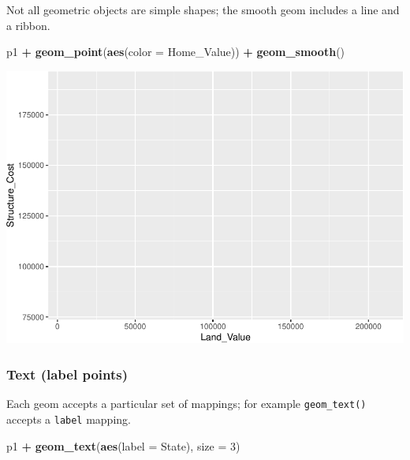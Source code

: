 \documentclass[]{book}
\newenvironment{Shaded}{\begin{snugshade}}{\end{snugshade}}
\newcommand{\DataTypeTok}[1]{\textcolor[rgb]{0.13,0.29,0.53}{#1}}
\newcommand{\DecValTok}[1]{\textcolor[rgb]{0.00,0.00,0.81}{#1}}
\newcommand{\KeywordTok}[1]{\textcolor[rgb]{0.13,0.29,0.53}{\textbf{#1}}}
\newcommand{\NormalTok}[1]{#1}
\newcommand{\OperatorTok}[1]{\textcolor[rgb]{0.81,0.36,0.00}{\textbf{#1}}}
\newcommand{\StringTok}[1]{\textcolor[rgb]{0.31,0.60,0.02}{#1}}
\begin{document}
Not all geometric objects are simple shapes; the smooth geom includes a line and a ribbon.

\begin{Shaded}
\begin{Highlighting}[]
\NormalTok{p1 }\OperatorTok{+}
\StringTok{  }\KeywordTok{geom_point}\NormalTok{(}\KeywordTok{aes}\NormalTok{(}\DataTypeTok{color =}\NormalTok{ Home_Value)) }\OperatorTok{+}
\StringTok{  }\KeywordTok{geom_smooth}\NormalTok{()}
\end{Highlighting}
\end{Shaded}

\includegraphics{R/Rgraphics/figures/unnamed-chunk-146-1.pdf}

\hypertarget{text-label-points}{%
\subsubsection{Text (label points)}\label{text-label-points}}

Each geom accepts a particular set of mappings; for example \texttt{geom\_text()} accepts a \texttt{label} mapping.

\begin{Shaded}
\begin{Highlighting}[]
\NormalTok{p1 }\OperatorTok{+}\StringTok{ }
\StringTok{  }\KeywordTok{geom_text}\NormalTok{(}\KeywordTok{aes}\NormalTok{(}\DataTypeTok{label =}\NormalTok{ State), }\DataTypeTok{size =} \DecValTok{3}\NormalTok{)}
\end{Highlighting}
\end{Shaded}
\end{document}
